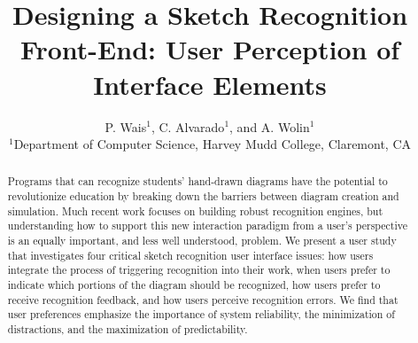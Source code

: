 \documentclass{egpubl}
\title[Designing a Sketch Recognition Front-End: User Perception of
Interface Elements]
      {Designing a Sketch Recognition Front-End: User Perception of
Interface Elements}
\author[P. Wais, C. Alvarado, and A. Wolin]
       {P. Wais$^1$, C. Alvarado$^1$, and A. Wolin$^1$
        \\
         $^1$Department of Computer Science, Harvey Mudd College, Claremont, CA\\
       }
\begin{document}
\maketitle

\begin{abstract}
   Programs that can recognize students' hand-drawn diagrams have the
   potential to revolutionize education by breaking down the barriers
   between diagram creation and simulation.  Much recent work focuses
   on building robust recognition engines, but understanding how to
   support this new interaction paradigm from a user's perspective is
   an equally important, and less well understood, problem.  We
   present a user study that investigates four critical sketch
   recognition user interface issues: how users integrate the process
   of triggering recognition into their work, when users prefer to
   indicate which portions of the diagram should be recognized, how
   users prefer to receive recognition feedback, and how users
   perceive recognition errors.  We find that user preferences
   emphasize the importance of system reliability, the minimization of
   distractions, and the maximization of predictability. 
   





 




\end{abstract}
\end{document}
